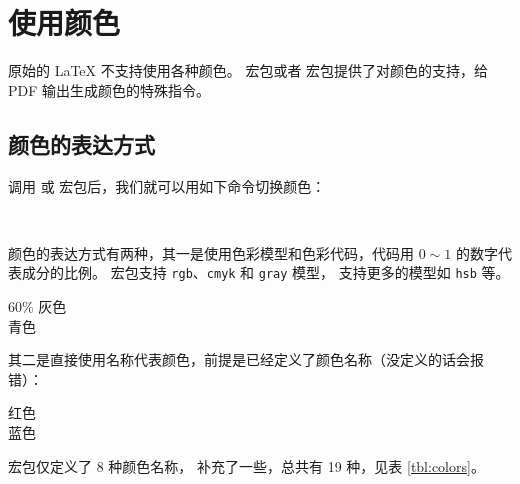 \section{使用颜色}\label{sec:color}

原始的 \LaTeX{} 不支持使用各种颜色。 宏包或者  宏包提供了对颜色的支持，给 PDF 输出生成颜色的特殊指令。

\subsection{颜色的表达方式}\label{subsec:color-code}

调用  或  宏包后，我们就可以用如下命令切换颜色：
\begin{command}
 \\
\end{command}

颜色的表达方式有两种，其一是使用色彩模型和色彩代码，代码用 $0\sim1$ 的数字代表成分的比例。
 宏包支持 \texttt{rgb}、\texttt{cmyk} 和 \texttt{gray} 模型， 支持更多的模型如 \texttt{hsb} 等。
\begin{example}
\large\sffamily
{\color[gray]{0.6}
  60\% 灰色} \\
{\color[rgb]{0,1,1}
  青色}
\end{example}

其二是直接使用名称代表颜色，前提是已经定义了颜色名称（没定义的话会报错）：
\begin{example}
\large\sffamily
{\color{red} 红色} \\
{\color{blue} 蓝色}
\end{example}

 宏包仅定义了 8 种颜色名称， 补充了一些，总共有 19 种，见表 \ref{tbl:colors}。

\def\showcolor#1{%
  \texttt{#1}\index{yanse@颜色!#1@\texttt{#1}}%
  \ \begingroup\fboxsep=0pt\fbox{{\color{#1}\vrule width 1.2em height 1.4ex}}\endgroup}
\def\showxcolor#1{%
  \texttt{#1}\index{yanse@颜色!#1@\texttt{#1} (\pkg{xcolor})}%
  \ \begingroup\fboxsep=0pt\fbox{{\color{#1}\vrule width 1.2em height 1.4ex}}\endgroup}

